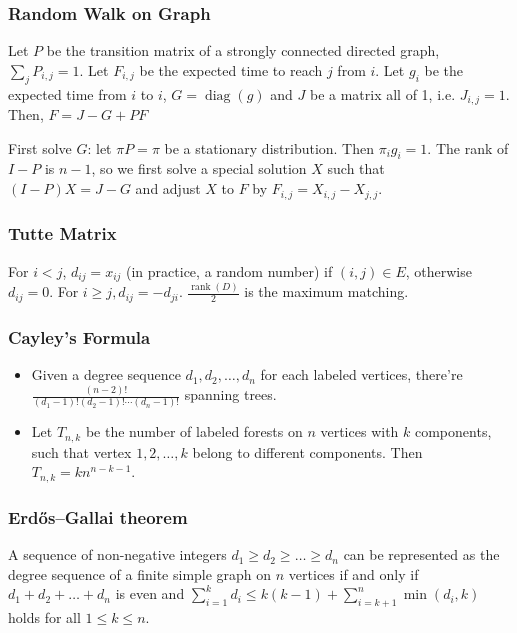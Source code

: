 \subsubsection{Random Walk on Graph}
Let $P$ be the transition matrix of a strongly connected directed graph, $\sum _ j P_{i,j} = 1$.
Let $F_{i,j}$ be the expected time to reach $j$ from $i$.
Let $g_i$ be the expected time from $i$ to $i$, $G = \operatorname{diag}(g)$
and $J$ be a matrix all of 1, i.e. $J_{i,j} = 1$.
Then, $F = J - G + PF$

\noindent
First solve $G$: let $\pi P = \pi$ be a stationary distribution. Then $\pi_i g_i = 1$.
The rank of $I - P$ is $n - 1$, so we first solve a special solution $X$ such that $(I - P)X = J - G$ and adjust $X$ to $F$ by
$F_{i,j} = X_{i,j} - X_{j,j}$.

\subsubsection{Tutte Matrix}
For $i < j$, $d_{ij} = x_{ij}$ (in practice, a random number) if $(i, j) \in E$, otherwise $d_{ij} = 0$.
For $i \geq j, d_{ij} = -d_{ji}$.
$\frac{\operatorname{rank}(D)}{2}$ is the maximum matching.

\subsubsection{Cayley's Formula}
\begin{itemize}
  \item Given a degree sequence $d_1, d_2, \ldots, d_n$ for each labeled vertices, there're $\frac{(n - 2)!}{(d_1 - 1)!(d_2 - 1)!\cdots(d_n - 1)!}$ spanning trees.
  \item Let $T_{n, k}$ be the number of labeled forests on $n$ vertices with $k$ components, such that vertex $1, 2, \ldots, k$ belong to different components. Then $T_{n, k} = kn^{n - k - 1}$.
\end{itemize}

\subsubsection{Erdős–Gallai theorem}
A sequence of non-negative integers $d_1 \geq d_2 \geq \ldots \geq d_n$ can be represented as the degree sequence of a finite simple graph on $n$ vertices if and only if $d_1 + d_2 + \ldots + d_n$ is even and
$\sum_{i = 1}^{k}d_i \leq k(k - 1) + \sum_{i = k + 1}^{n}\min(d_i, k)$
holds for all $1 \leq k \leq n$.

